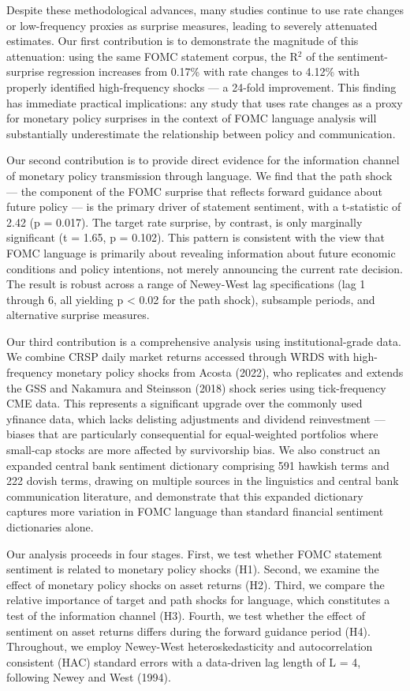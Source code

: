 \documentclass[12pt]{article}
\begin{document}
Despite these methodological advances, many studies continue to use rate changes or low-frequency proxies as surprise measures, leading to severely attenuated estimates. Our first contribution is to demonstrate the magnitude of this attenuation: using the same FOMC statement corpus, the R$^2$ of the sentiment-surprise regression increases from 0.17\% with rate changes to 4.12\% with properly identified high-frequency shocks --- a 24-fold improvement. This finding has immediate practical implications: any study that uses rate changes as a proxy for monetary policy surprises in the context of FOMC language analysis will substantially underestimate the relationship between policy and communication.

Our second contribution is to provide direct evidence for the information channel of monetary policy transmission through language. We find that the path shock --- the component of the FOMC surprise that reflects forward guidance about future policy --- is the primary driver of statement sentiment, with a t-statistic of 2.42 (p = 0.017). The target rate surprise, by contrast, is only marginally significant (t = 1.65, p = 0.102). This pattern is consistent with the view that FOMC language is primarily about revealing information about future economic conditions and policy intentions, not merely announcing the current rate decision. The result is robust across a range of Newey-West lag specifications (lag 1 through 6, all yielding p < 0.02 for the path shock), subsample periods, and alternative surprise measures.

Our third contribution is a comprehensive analysis using institutional-grade data. We combine CRSP daily market returns accessed through WRDS with high-frequency monetary policy shocks from Acosta (2022), who replicates and extends the GSS and Nakamura and Steinsson (2018) shock series using tick-frequency CME data. This represents a significant upgrade over the commonly used yfinance data, which lacks delisting adjustments and dividend reinvestment --- biases that are particularly consequential for equal-weighted portfolios where small-cap stocks are more affected by survivorship bias. We also construct an expanded central bank sentiment dictionary comprising 591 hawkish terms and 222 dovish terms, drawing on multiple sources in the linguistics and central bank communication literature, and demonstrate that this expanded dictionary captures more variation in FOMC language than standard financial sentiment dictionaries alone.

Our analysis proceeds in four stages. First, we test whether FOMC statement sentiment is related to monetary policy shocks (H1). Second, we examine the effect of monetary policy shocks on asset returns (H2). Third, we compare the relative importance of target and path shocks for language, which constitutes a test of the information channel (H3). Fourth, we test whether the effect of sentiment on asset returns differs during the forward guidance period (H4). Throughout, we employ Newey-West heteroskedasticity and autocorrelation consistent (HAC) standard errors with a data-driven lag length of L = 4, following Newey and West (1994).
\end{document}
